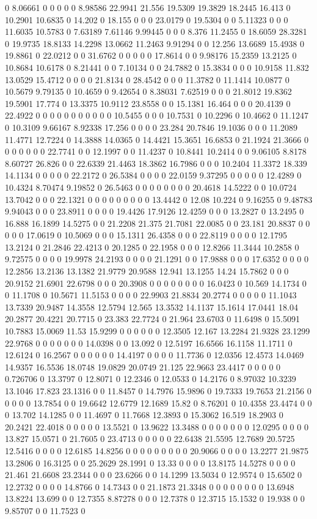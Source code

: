 0 8.06661 0 0 0 0 0 8.98586 22.9941 21.556 19.5309 19.3829 18.2445 16.413 0 10.2901 10.6835 0 14.202 0 18.155 0 0 0 23.0179 0 19.5304 0 0 5.11323 0 0 0 11.6035 10.5783 0 7.63189 7.61146 9.99445 0 0 0 8.376 11.2455 0 18.6059 28.3281 0 19.9735 18.8133 14.2298 13.0662 11.2463 9.91294 0 0 12.256 13.6689 15.4938 0 19.8861 0 22.0212 0 0 31.6762 0 0 0 0 0 17.8614 0 0 9.98176 15.2359 13.2125 0 10.8684 10.6178 0 8.21441 0 0 7.10134 0 0 24.7882 0 15.3834 0 0 0 10.9158 11.832 13.0529 15.4712 0 0 0 0 21.8134 0 28.4542 0 0 0 11.3782 0 11.1414 10.0877 0 10.5679 9.79135 0 10.4659 0 9.42654 0 8.38031 7.62519 0 0 0 21.8012 19.8362 19.5901 17.774 0 13.3375 10.9112 23.8558 0 0 15.1381 16.464 0 0 0 20.4139 0 22.4922 0 0 0 0 0 0 0 0 0 0 0 10.5455 0 0 0 10.7531 0 10.2296 0 10.4662 0 11.1247 0 10.3109 9.66167 8.92338 17.256 0 0 0 0 23.284 20.7846 19.1036 0 0 0 11.2089 11.4771 12.7224 0 14.3888 14.0365 0 14.4421 15.3651 16.6853 0 21.1924 21.3666 0 0 0 0 0 0 0 22.7741 0 0 12.1997 0 0 11.4237 0 10.8441 10.2414 0 0 9.06105 8.8178 8.60727 26.826 0 0 22.6339 21.4463 18.3862 16.7986 0 0 0 10.2404 11.3372 18.339 14.1134 0 0 0 0 0 22.2172 0 26.5384 0 0 0 0 22.0159 9.37295 0 0 0 0 0 12.4289 0 10.4324 8.70474 9.19852 0 26.5463 0 0 0 0 0 0 0 0 20.4618 14.5222 0 0 10.0724 13.7042 0 0 0 22.1321 0 0 0 0 0 0 0 0 0 13.4442 0 12.08 10.224 0 9.16255 0 9.48783 9.94043 0 0 0 23.8911 0 0 0 0 19.4426 17.9126 12.4259 0 0 0 13.2827 0 13.2495 0 16.888 16.1899 14.5275 0 0 21.2208 21.375 21.7081 22.0085 0 0 23.181 20.8837 0 0 0 0 0 17.0619 0 10.5069 0 0 0 15.1311 26.4358 0 0 0 22.8119 0 0 0 0 12.1795 13.2124 0 21.2846 22.4213 0 20.1285 0 22.1958 0 0 0 12.8266 11.3444 10.2858 0 9.72575 0 0 0 0 19.9978 24.2193 0 0 0 0 21.1291 0 0 17.9888 0 0 0 17.6352 0 0 0 0 12.2856 13.2136 13.1382 21.9779 20.9588 12.941 13.1255 14.24 15.7862 0 0 0 20.9152 21.6901 22.6798 0 0 0 20.3908 0 0 0 0 0 0 0 0 16.0423 0 10.569 14.1734 0 0 11.1708 0 10.5671 11.5153 0 0 0 0 22.9903 21.8834 20.2774 0 0 0 0 0 11.1043 13.7339 20.9487 14.3558 12.5794 12.565 13.3532 14.1137 15.1614 17.0441 18.04 20.2877 20.4221 20.7715 0 23.383 22.7724 0 21.964 23.6703 0 11.6498 0 15.5091 10.7883 15.0069 11.53 15.9299 0 0 0 0 0 0 12.3505 12.167 13.2284 21.9328 23.1299 22.9768 0 0 0 0 0 0 0 14.0398 0 0 13.092 0 12.5197 16.6566 16.1158 11.1711 0 12.6124 0 16.2567 0 0 0 0 0 0 14.4197 0 0 0 0 11.7736 0 12.0356 12.4573 14.0469 14.9357 16.5536 18.0748 19.0829 20.0749 21.125 22.9663 23.4417 0 0 0 0 0 0.726706 0 13.3797 0 12.8071 0 12.2346 0 12.0533 0 14.2176 0 8.97032 10.3239 13.1046 17.823 23.1316 0 0 11.8457 0 14.7976 15.9896 0 19.7333 19.7653 21.2156 0 0 0 0 0 13.7854 0 0 19.6642 12.6779 12.1689 15.82 0 8.76201 0 10.4358 23.4474 0 0 0 13.702 14.1285 0 0 11.4697 0 11.7668 12.3893 0 15.3062 16.519 18.2903 0 20.2421 22.4018 0 0 0 0 0 13.5521 0 13.9622 13.3488 0 0 0 0 0 0 0 12.0295 0 0 0 0 13.827 15.0571 0 21.7605 0 23.4713 0 0 0 0 0 22.6438 21.5595 12.7689 20.5725 12.5416 0 0 0 0 12.6185 14.8256 0 0 0 0 0 0 0 0 0 20.9066 0 0 0 0 13.2277 21.9875 13.2806 0 16.3125 0 0 25.2629 28.1991 0 13.33 0 0 0 0 13.8175 14.5278 0 0 0 0 21.461 21.6608 23.2344 0 0 0 23.6266 0 0 14.1299 13.5034 0 12.9574 0 15.6502 0 12.2732 0 0 0 0 14.8766 0 14.7343 0 0 21.1873 21.3348 0 0 0 0 0 0 0 0 13.6948 13.8224 13.699 0 0 12.7355 8.87278 0 0 0 12.7378 0 12.3715 15.1532 0 19.938 0 0 9.85707 0 0 11.7523 0 